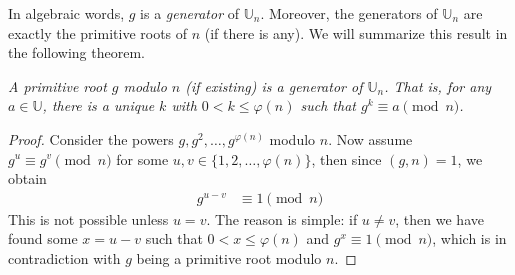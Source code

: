 \documentclass{subfile}
\begin{document}
In algebraic words, $g$ is a \textit{generator} of $\mathbb U_n$. Moreover, the generators of $\mathbb U_n$ are exactly the primitive roots of $n$ (if there is any). We will summarize this result in the following theorem.

	\begin{theorem}\slshape\label{thm:prequalsU}
		A primitive root $g$ modulo $n$ (if existing) is a generator of $\mathbb U_n$. That is, for any $a\in\mathbb{U}$, there is a unique $k$ with $0< k\leq\varphi(n)$ such that $g^k \equiv a \pmod n$.
	\end{theorem}

	\begin{proof}
		Consider the powers $g,g^2,\ldots,g^{\varphi (n)}$ modulo $n$. Now assume  $g^u  \equiv g^v \pmod n$ for some $u, v \in \{1,2,\ldots, \varphi(n)\}$, then since $(g,n)=1$, we obtain
			\begin{align*}
				g^{u-v}&\equiv1\pmod n
			\end{align*}
		This is not possible unless $u=v$. The reason is simple: if $u \neq v$, then we have found some $x=u-v$ such that $0 < x \leq \varphi(n)$ and $g^x \equiv 1 \pmod n$, which is in contradiction with $g$ being a primitive root modulo $n$.
	\end{proof}
\end{document}

